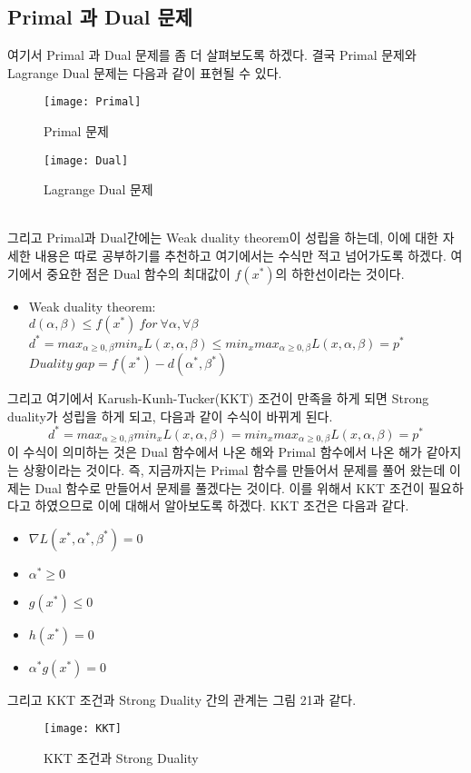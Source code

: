\documentclass[a4paper]{oblivoir}
\begin{document}
\subsection{Primal 과 Dual 문제}
\indent 여기서 Primal 과 Dual 문제를 좀 더 살펴보도록 하겠다. 결국 Primal 문제와 Lagrange Dual 문제는 다음과 같이 표현될 수 있다.\\
\begin{figure}[ht]\centering
\parbox[t]{4cm}{\texttt{[image: Primal]}\caption{Primal 문제}\label{Fig:5-19}}\hspace{2cm}
\parbox[t]{4.5cm}{\texttt{[image: Dual]}\caption{Lagrange Dual 문제}\label{Fig:5-20}}
\end{figure}\\
그리고 Primal과 Dual간에는 Weak duality theorem이 성립을 하는데, 이에 대한 자세한 내용은 따로 공부하기를 추천하고 여기에서는 수식만 적고 넘어가도록 하겠다. 여기에서 중요한 점은 Dual 함수의 최대값이 $f(x^*)$의 하한선이라는 것이다.
\begin{itemize}\setlength\itemsep{-\parsep}
	\item Weak duality theorem:\\
	$d(\alpha,\beta)\leq f(x^*)\ for\ \forall\alpha,\forall\beta$\\
	$d^*=max_{\alpha\geq 0, \beta}min_{x} L(x,\alpha,\beta)\leq min_x max_{\alpha\geq 0, \beta} L(x,\alpha,\beta)=p^*$\\
	$Duality\ gap=f(x^*)-d(\alpha^*,\beta^*)$\\
\end{itemize}
그리고 여기에서 Karush-Kunh-Tucker(KKT) 조건이 만족을 하게 되면 Strong duality가 성립을 하게 되고, 다음과 같이 수식이 바뀌게 된다.
\begin{equation}
d^*=max_{\alpha\geq 0, \beta}min_{x} L(x,\alpha,\beta)= min_x max_{\alpha\geq 0, \beta} L(x,\alpha,\beta)=p^*
\label{eq:5-26}
\end{equation}
이 수식이 의미하는 것은 Dual 함수에서 나온 해와 Primal 함수에서 나온 해가 같아지는 상황이라는 것이다. 즉, 지금까지는 Primal 함수를 만들어서 문제를 풀어 왔는데 이제는 Dual 함수로 만들어서 문제를 풀겠다는 것이다. 이를 위해서 KKT 조건이 필요하다고 하였으므로 이에 대해서 알아보도록 하겠다. KKT 조건은 다음과 같다.

\begin{itemize}\setlength\itemsep{-\parsep}
	\item $\nabla L(x^*,\alpha^*,\beta^*)=0$
	\item $\alpha^*\geq 0$
	\item $g(x^*)\leq 0$
	\item $h(x^*)=0$
	\item $\alpha^*g(x^*)=0$
\end{itemize}
\indent 그리고 KKT 조건과 Strong Duality 간의 관계는 그림 21과 같다.
\begin{figure}[ht]\centering
\texttt{[image: KKT]}\caption{KKT 조건과 Strong Duality}\label{Fig:5-21}
\end{figure}
\end{document}
